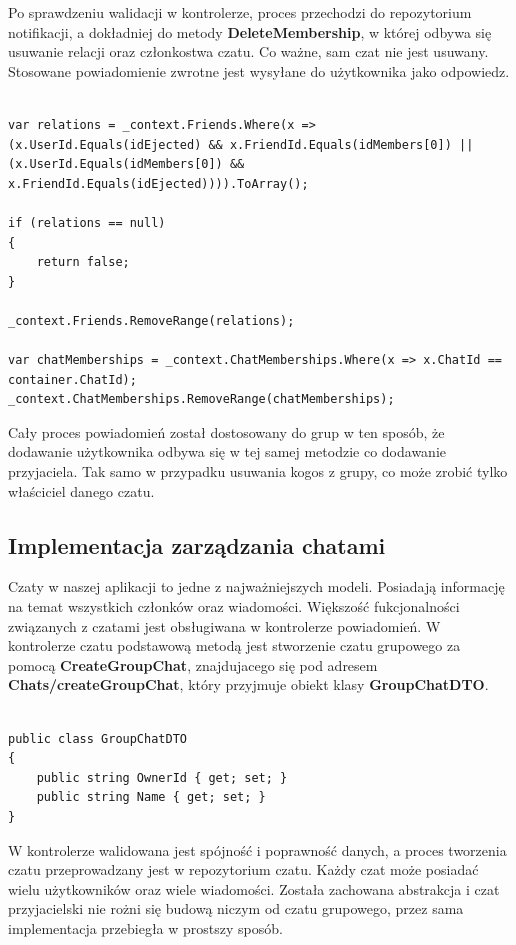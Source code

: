 \documentclass[12pt,a4paper]{article}
\begin{document}
Po sprawdzeniu walidacji w kontrolerze, proces przechodzi do repozytorium notifikacji, a dokładniej do metody \textbf{DeleteMembership}, w której odbywa się usuwanie relacji oraz członkostwa czatu. Co ważne, sam czat nie jest usuwany. Stosowane powiadomienie zwrotne jest wysyłane do użytkownika jako odpowiedz.

\begin{lstlisting}[caption={Implementacja usuwania relacji}]

var relations = _context.Friends.Where(x => (x.UserId.Equals(idEjected) && x.FriendId.Equals(idMembers[0]) || (x.UserId.Equals(idMembers[0]) && x.FriendId.Equals(idEjected)))).ToArray();

if (relations == null)
{
	return false;
}

_context.Friends.RemoveRange(relations);

var chatMemberships = _context.ChatMemberships.Where(x => x.ChatId == container.ChatId);
_context.ChatMemberships.RemoveRange(chatMemberships);
\end{lstlisting}

Cały proces powiadomień został dostosowany do grup w ten sposób, że dodawanie użytkownika odbywa się w tej samej metodzie co dodawanie przyjaciela. Tak samo w przypadku usuwania kogos z grupy, co może zrobić tylko właściciel danego czatu.

\subsection{Implementacja zarządzania chatami} 
\hspace*{0.7cm} Czaty w naszej aplikacji to jedne z najważniejszych modeli. Posiadają informację na temat wszystkich członków oraz wiadomości. Większość fukcjonalności związanych z czatami jest obsługiwana w kontrolerze powiadomień. W kontrolerze czatu podstawową metodą jest stworzenie czatu grupowego za pomocą \textbf{CreateGroupChat}, znajdujacego się pod adresem \textbf{Chats/createGroupChat}, który przyjmuje obiekt klasy \textbf{GroupChatDTO}.

\begin{lstlisting}[caption={Implementacja klasy GroupChatDTO}]

public class GroupChatDTO
{
	public string OwnerId { get; set; }
	public string Name { get; set; }
}
\end{lstlisting}

W kontrolerze walidowana jest spójność i poprawność danych, a proces tworzenia czatu przeprowadzany jest w repozytorium czatu. Każdy czat może posiadać wielu użytkowników oraz wiele wiadomości. Została zachowana abstrakcja i czat przyjacielski nie rożni się budową niczym od czatu grupowego, przez sama implementacja przebiegła w prostszy sposób.
\end{document}
